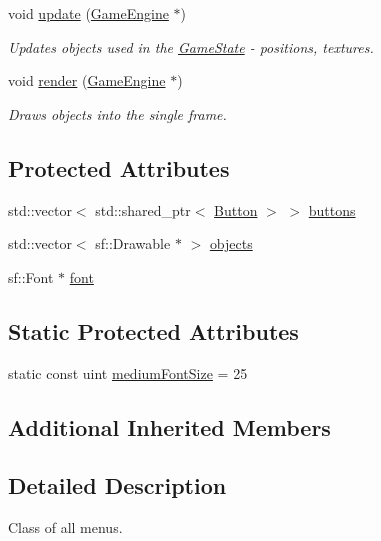 \begin{DoxyCompactItemize}
void \mbox{\hyperlink{class_base_menu_state_abfc8c5d2c7c3811443fc79a107a5936e}{update}} (\mbox{\hyperlink{class_game_engine}{Game\+Engine}} $\ast$)
\begin{DoxyCompactList}\small\item\em Updates objects used in the \mbox{\hyperlink{class_game_state}{Game\+State}} -\/ positions, textures. \end{DoxyCompactList}\item 
void \mbox{\hyperlink{class_base_menu_state_a404076aa3e789fa75ba1bfe7752c1e18}{render}} (\mbox{\hyperlink{class_game_engine}{Game\+Engine}} $\ast$)
\begin{DoxyCompactList}\small\item\em Draws objects into the single frame. \end{DoxyCompactList}\end{DoxyCompactItemize}
\subsection*{Protected Attributes}
\begin{DoxyCompactItemize}
\item 
std\+::vector$<$ std\+::shared\+\_\+ptr$<$ \mbox{\hyperlink{class_button}{Button}} $>$ $>$ \mbox{\hyperlink{class_base_menu_state_ab63cc442453d06b70372d627ceaf8a8e}{buttons}}
\item 
std\+::vector$<$ sf\+::\+Drawable $\ast$ $>$ \mbox{\hyperlink{class_base_menu_state_a59278b3c16e953a01ad350b179024778}{objects}}
\item 
sf\+::\+Font $\ast$ \mbox{\hyperlink{class_base_menu_state_a2759c3ca4cfd0f34175846e295e0f4e9}{font}}
\end{DoxyCompactItemize}
\subsection*{Static Protected Attributes}
\begin{DoxyCompactItemize}
\item 
static const uint \mbox{\hyperlink{class_base_menu_state_a003cf33aa9c69fa85db7486f6812b4f6}{medium\+Font\+Size}} = 25
\end{DoxyCompactItemize}
\subsection*{Additional Inherited Members}


\subsection{Detailed Description}
Class of all menus. 

